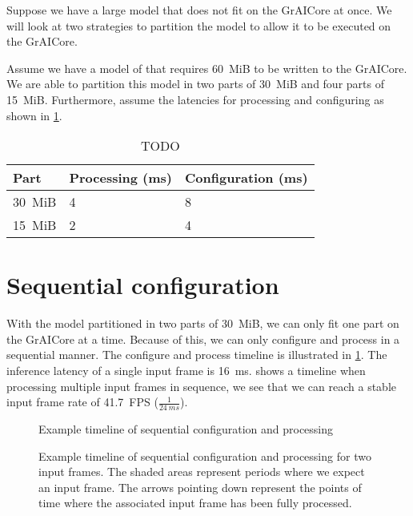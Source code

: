 Suppose we have a large model that does not fit on the GrAICore at once.
We will look at two strategies to partition the model to allow it to be executed on the GrAICore.

Assume we have a model of that requires \SI{60}{MiB} to be written to the GrAICore.
We are able to partition this model in two parts of \SI{30}{MiB} and four parts of \SI{15}{MiB}.
Furthermore, assume the latencies for processing and configuring as shown in \cref{tab:partitiong_strategies_example}.

\begin{table}[hbtp]
\centering
\begin{tabular}{@{}lll@{}}
\toprule
\textbf{Part} & \textbf{Processing (ms)} & \textbf{Configuration (ms)} \\ \midrule
\SI{30}{MiB}  & 4                        & 8                           \\
\SI{15}{MiB}  & 2                        & 4                          
\end{tabular}
\caption{TODO}
\label{tab:partitiong_strategies_example}
\end{table}

\section{Sequential configuration}
With the model partitioned in two parts of \SI{30}{MiB}, we can only fit one part on the GrAICore at a time.
Because of this, we can only configure and process in a sequential manner.
The configure and process timeline is illustrated in \cref{fig:schedule_sequential_configuration}.
The inference latency of a single input frame is \SI{16}{ms}.
 shows a timeline when processing multiple input frames in sequence, we see that we can reach a stable input frame rate of \SI{41.7}{FPS} ($\frac{1}{\SI{24}{ms}}$).

\begin{figure}[hbtp]
    \centering
    \resizebox{0.6\linewidth}{!}{
        
    }
    \caption{Example timeline of sequential configuration and processing}
    \label{fig:schedule_sequential_configuration}
\end{figure}

\begin{figure}[hbtp]
    \centering
    \resizebox{1.0\linewidth}{!}{
        
    }
    \caption{
    Example timeline of sequential configuration and processing for two input frames.
    The shaded areas represent periods where we expect an input frame.
    The arrows pointing down represent the points of time where the associated input frame has been fully processed.
    }
    \label{fig:schedule_sequential_configuration_extended}
\end{figure}

